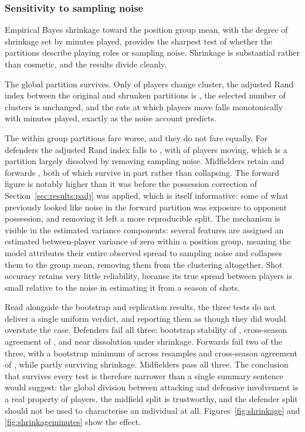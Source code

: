 \subsubsection{Sensitivity to sampling noise}
\label{sec:results:shrinkage}
Empirical Bayes shrinkage toward the position group mean, with the degree of shrinkage set
by minutes played, provides the sharpest test of whether the partitions describe playing
roles or sampling noise. Shrinkage is substantial rather than cosmetic, and the results
divide cleanly.

The global partition survives. Only \ShrinkChangedGlobal{} of \NEligiblePrimary{} players
change cluster, the adjusted Rand index between the original and shrunken partitions is
\ShrinkARIGlobal{}, the selected number of clusters is unchanged, and the rate at which
players move falls monotonically with minutes played, exactly as the noise account
predicts.

The within group partitions fare worse, and they do not fare equally. For defenders the
adjusted Rand index falls to \ShrinkARIDF{}, with \ShrinkChangedDF{} of \NDFPrimary{}
players moving, which is a partition largely dissolved by removing sampling noise.
Midfielders retain \ShrinkARIMF{} and forwards \ShrinkARIFW{}, both of which survive in
part rather than collapsing. The forward figure is notably higher than it was before the
possession correction of Section~\ref{sec:results:padj} was applied, which is itself
informative: some of what previously looked like noise in the forward partition was
exposure to opponent possession, and removing it left a more reproducible split. The mechanism is
visible in the estimated variance components: several features are assigned an estimated
between-player variance of zero within a position group, meaning the model attributes
their entire observed spread to sampling noise and collapses them to the group mean,
removing them from the clustering altogether. Shot accuracy retains very little
reliability, because its true spread between players is small relative to the noise in
estimating it from a season of shots.

Read alongside the bootstrap and replication results, the three tests do not deliver a
single uniform verdict, and reporting them as though they did would overstate the case.
Defenders fail all three: bootstrap stability of \BootARIDF{}, cross-season agreement of
\CrossSeasonARIDF{}, and near dissolution under shrinkage. Forwards fail two of the three,
with a bootstrap minimum of \BootARIMinFW{} across resamples and cross-season agreement of
\CrossSeasonARIFW{}, while partly surviving shrinkage. Midfielders pass all three. The
conclusion that survives every test is therefore narrower than a single summary sentence
would suggest: the global division between attacking and defensive involvement is a real
property of players, the midfield split is trustworthy, and the defender split should not
be used to characterise an individual at all.
Figures~\ref{fig:shrinkage} and \ref{fig:shrinkageminutes} show the effect.

